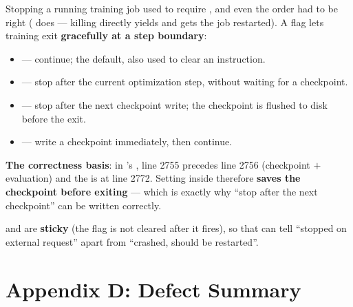 \documentclass[11pt,openany]{article}
\begin{document}
Stopping a running training job used to require , and even the order had to be
right ( does
 --- killing 
directly yields  and gets the job restarted). A flag lets training exit
\textbf{gracefully at a step boundary}:

\begin{itemize}
\item {} --- continue; the default, also used to clear an instruction.
\item {} --- stop after the current optimization step, without waiting for a
      checkpoint.
\item {} --- stop after the next checkpoint write; the checkpoint is
      flushed to disk before the exit.
\item {} --- write a checkpoint immediately, then continue.
\end{itemize}

\textbf{The correctness basis}: in 's
, line 2755  precedes line 2756
 (checkpoint $+$ evaluation) and the  is at
line 2772. Setting  inside  therefore
\textbf{saves the checkpoint before exiting} --- which is exactly why ``stop after the next
checkpoint'' can be written correctly.

 and  are \textbf{sticky} (the flag is not cleared after it
fires), so that  can tell ``stopped on external request'' apart from
``crashed, should be restarted''.

\section{Appendix D: Defect Summary}
\label{sec:en-appD}
\end{document}

